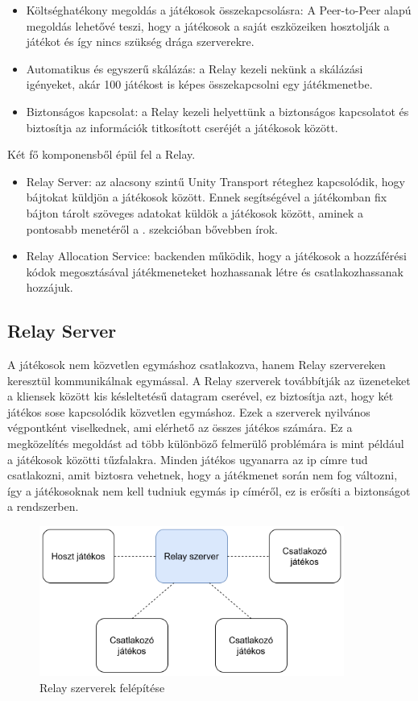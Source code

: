 \documentclass[]{thesis-ekf}
\theoremstyle{definition}
\theoremstyle{remark}
\begin{document}
\begin{itemize}
	\item Költséghatékony megoldás a játékosok összekapcsolásra: A Peer-to-Peer alapú megoldás lehetővé teszi, hogy a játékosok a saját eszközeiken hosztolják a játékot és így nincs szükség drága szerverekre.
	\item Automatikus és egyszerű skálázás: a Relay kezeli nekünk a skálázási igényeket, akár 100 játékost is képes összekapcsolni egy játékmenetbe.
	\item Biztonságos kapcsolat: a Relay kezeli helyettünk a biztonságos kapcsolatot és biztosítja az információk titkosított cseréjét a játékosok között.
\end{itemize}

Két fő komponensből épül fel a Relay.

\begin{itemize}
	\item Relay Server: az alacsony szintű Unity Transport réteghez kapcsolódik, hogy bájtokat küldjön a játékosok között. Ennek segítségével a játékomban fix bájton tárolt szöveges adatokat küldök a játékosok között, aminek a pontosabb menetéről a . szekcióban bővebben írok.
	\item Relay Allocation Service: backenden működik, hogy a játékosok a hozzáférési kódok megosztásával játékmeneteket hozhassanak létre és csatlakozhassanak hozzájuk. \cite{UnityAllocationsService}
\end{itemize}

\subsection{Relay Server}
A játékosok nem közvetlen egymáshoz csatlakozva, hanem Relay szervereken keresztül kommunikálnak egymással. A Relay szerverek továbbítják az üzeneteket a kliensek között kis késleltetésű datagram cserével, ez biztosítja azt, hogy két játékos sose kapcsolódik közvetlen egymáshoz. Ezek a szerverek nyilvános végpontként viselkednek, ami elérhető az összes játékos számára. Ez a megközelítés megoldást ad több különböző felmerülő problémára is mint például a játékosok közötti tűzfalakra. Minden játékos ugyanarra az ip címre tud csatlakozni, amit biztosra vehetnek, hogy a játékmenet során nem fog változni, így a játékosoknak nem kell tudniuk egymás ip címéről, ez is erősíti a biztonságot a rendszerben. \cite{UnityRelayServers}

\begin{figure}[ht!]
	\centering
	\includegraphics[width=10cm]{RelayServer}
	\caption{Relay szerverek felépítése}
	\label{fig-unityrelayservers}
\end{figure}
\end{document}
